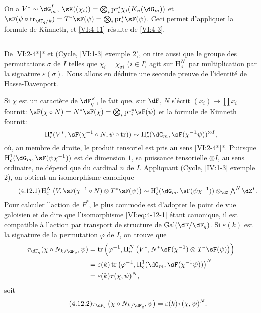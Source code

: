 On a $V^\ast\sim \dG_m^I$, 
$\sK((\chi_i)) = \bigotimes_i \pr_i^\ast \chi_i(K_n(\dG_m))$ et 
$\sF(\psi\circ \tr_{\dF_q/k})=T^\ast \sF(\psi) = \bigotimes_i \pr_i^\ast \sF(\psi)$. 
Ceci permet d'appliquer la formule de K\"unneth, et \ref{VI:4-11} r\'esulte de 
\ref{VI:4-3}. 





\subsection{}\label{VI:4-12}

De \ref{VI:2-4*}* et (\hyperlink{VI}{Cycle}, \ref{VI:1-3} exemple 2), on tire 
aussi que le groupe des permutations $\sigma$ de $I$ telles que 
$\chi_i = \chi_{\sigma i}$ ($i\in I$) agit sur $\operatorname{H}_c^N$ par multiplication par 
la signature $\varepsilon(\sigma)$. Nous allons en d\'eduire une seconde preuve 
de l'identit\'e de Hasse-Davenport. 

Si $\chi$ est un caract\`ere de $\dF_q^\times$, le fait que, sur $\dF$, $N$ 
s'\'ecrit $(x_i)\mapsto \prod x_i$ fournit: 
$\sF(\chi\circ N)=N^\ast\sF(\chi) = \bigotimes_i \pr_i^\ast\sF(\psi)$ 
et la formule de K\"unneth fournit: 
\[
  \h_c^\bullet(V^\ast,\sF(\chi^{-1}\circ N,\psi\circ \tr)) \sim \h_c^\bullet(\dG_m,\sF(\chi^{-1}\psi))^{\otimes I} \text{,} 
\]
o\`u, au membre de droite, le produit tensoriel est pris au sens 
\ref{VI:2-4*}*. Puirsque $\h_c^1(\dG_m,\sF(\psi\chi^{-1}))$ est de dimension 
$1$, sa puissance tensorielle $\otimes I$, au sens ordinaire, ne d\'epend que 
du cardinal $n$ de $I$. Appliquant (\hyperlink{IV}{Cycle}, \ref{IV:1-3} exemple 
2), on obtient un isomorphisme canonique 
\begin{equation*}\tag{4.12.1}\label{VI:eq:4-12-1}
  \h_c^N\left(V,\sF(\chi^{-1}\circ N)\otimes T^\ast \sF(\psi)\right) \sim \h_c^1(\dG_m,\sF(\psi\chi^{-1})) \otimes_\dZ \textstyle \bigwedge^N \dZ^I \text{.}
\end{equation*}
Pour calculer l'action de $F^\ast$, le plus commode est d'adopter le point de 
vue galoisien et de dire que l'isomorphisme \eqref{VI:eq:4-12-1} \'etant 
canonique, il est compatible \`a l'action par transport de structure de 
$\gal(\dF/\dF_q)$. Si $\varepsilon(k)$ est la signature de la permutation 
$\varphi$ de $I$, on trouve que 
\begin{align*} 
  \tau_{\dF_q}(\chi\circ N_{k/\dF_q},\psi) 
    &= \tr\left(\varphi^{-1},\h_c^N\left(V^\ast,N^\ast\sF(\chi^{-1})\otimes T^\ast \sF(\psi)\right)\right) \\ 
    &= \varepsilon(k) \tr\left(\varphi^{-1},\h_c^1(\dG_m,\sF(\chi^{-1}\psi))\right)^N \\
    &= \varepsilon(k) \tau(\chi,\psi)^N \text{,} 
\end{align*}
soit 
\begin{equation*}\tag{4.12.2}\label{VI:eq:4-12-2}
  \tau_{\dF_q}\left(\chi\circ N_{k/\dF_q},\psi\right) = \varepsilon(k) \tau(\chi,\psi)^N \text{.} 
\end{equation*}

